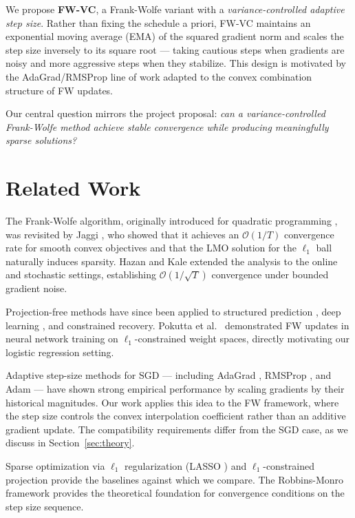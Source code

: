 \documentclass[10pt,twocolumn]{article}
\begin{document}
We propose \textbf{FW-VC}, a Frank-Wolfe variant with a
\emph{variance-controlled adaptive step size}. Rather than fixing the schedule
a priori, FW-VC maintains an exponential moving average (EMA) of the squared
gradient norm and scales the step size inversely to its square root — taking
cautious steps when gradients are noisy and more aggressive steps when they
stabilize. This design is motivated by the AdaGrad/RMSProp line of work
\cite{duchi2011,tieleman2012} adapted to the convex combination structure
of FW updates.

Our central question mirrors the project proposal: \emph{can a
variance-controlled Frank-Wolfe method achieve stable convergence while
producing meaningfully sparse solutions?}


\section{Related Work}
\label{sec:related}

The Frank-Wolfe algorithm, originally introduced for quadratic programming
\cite{frank1956}, was revisited by Jaggi \cite{jaggi2013}, who showed that
it achieves an $\mathcal{O}(1/T)$ convergence rate for smooth convex
objectives and that the LMO solution for the $\ell_1$ ball naturally induces
sparsity. Hazan and Kale \cite{hazan2012} extended the analysis to the
online and stochastic settings, establishing $\mathcal{O}(1/\sqrt{T})$
convergence under bounded gradient noise.

Projection-free methods have since been applied to structured prediction
\cite{jaggi2013}, deep learning \cite{pokutta2020}, and constrained
recovery. Pokutta et al.\ \cite{pokutta2020} demonstrated FW updates in
neural network training on $\ell_1$-constrained weight spaces, directly
motivating our logistic regression setting.

Adaptive step-size methods for SGD — including AdaGrad \cite{duchi2011},
RMSProp \cite{tieleman2012}, and Adam \cite{kingma2015} — have shown strong
empirical performance by scaling gradients by their historical magnitudes.
Our work applies this idea to the FW framework, where the step size
controls the convex interpolation coefficient rather than an additive
gradient update. The compatibility requirements differ from the SGD case,
as we discuss in Section~\ref{sec:theory}.

Sparse optimization via $\ell_1$ regularization (LASSO \cite{tibshirani1996})
and $\ell_1$-constrained projection \cite{duchi2008} provide the baselines
against which we compare. The Robbins-Monro framework \cite{robbins1951}
provides the theoretical foundation for convergence conditions on the step
size sequence.
\end{document}
